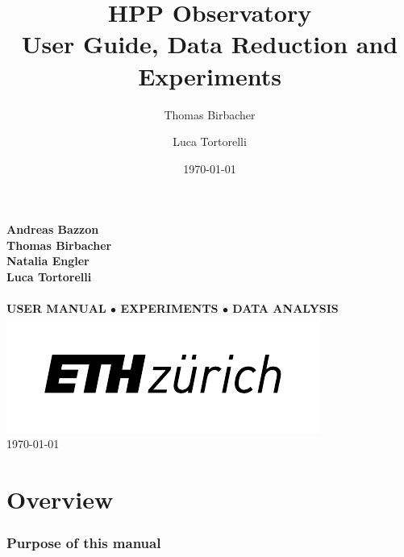 \documentclass[a4paper, 11pt, fleqn]{memoir}
\begin{document}

\date{\today}
\author{Thomas Birbacher \and Luca Tortorelli}
\title{HPP Observatory \\ User Guide, Data Reduction and Experiments}


\begin{titlingpage}
    \begin{center}
        \vspace{4cm}
        {\large\bfseries Andreas Bazzon}\\
        {\large\bfseries Thomas Birbacher}\\
        {\large\bfseries Natalia Engler}\\
        {\large\bfseries Luca Tortorelli}\\
        \vspace{3cm}
        {}\\ \vspace{0.6cm} {\LARGE\bfseries {} USER MANUAL
            $
                \bullet
            $
            EXPERIMENTS
            $
                \bullet
            $
            DATA ANALYSIS}\\ \vfill \includegraphics{eth-logo}\\ \today
    \end{center}
\end{titlingpage}

\newcommand{\software}[1]{\texttt{#1}}

\frontmatter

\chapter{Overview}

\subsection*{Purpose of this manual}
\end{document}
